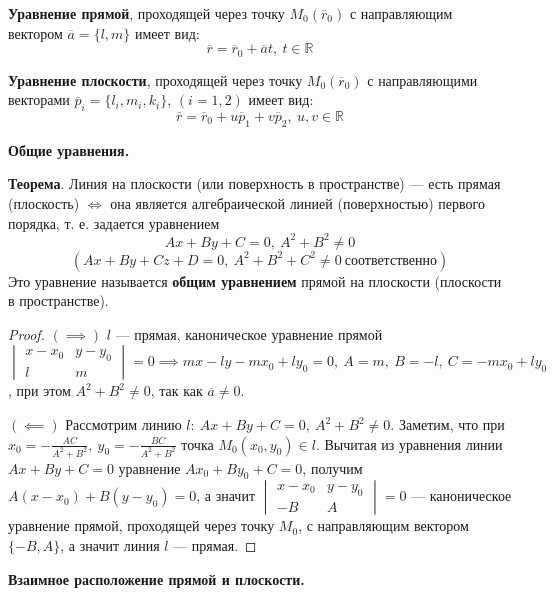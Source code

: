 \textbf{Уравнение прямой}, проходящей через точку $M_0(\overline{r}_0)$ с направляющим вектором $\overline{a}=\{l,m\}$ имеет вид:
$$\overline{r} = \overline{r}_0 + \overline{a}t,~t\in\mathbb{R}$$

\textbf{Уравнение плоскости}, проходящей через точку $M_0(\overline{r}_0)$ с направляющими векторами $\overline{p}_i=\{l_i,m_i,k_i\}$, $(i=1,2)$ имеет вид:
$$\overline{r} = \overline{r}_0 + u\overline{p}_1 + v\overline{p}_2,~u,v\in\mathbb{R}$$

\bigbreak
\centerline{\textbf{Общие уравнения.}}

\textbf{Теорема}. Линия на плоскости (или поверхность в пространстве) --- есть прямая (плоскость) $\iff$ она является алгебраической линией (поверхностью) первого порядка, т. е. задается уравнением $$Ax+By+C=0,~A^2+B^2\neq0$$ $$(Ax+By+Cz+D=0,~A^2+B^2+C^2\neq0~\text{соответственно})$$ 
Это уравнение называется \textbf{общим уравнением} прямой на плоскости (плоскости в пространстве).

\begin{proof} $(\implies)$
$l$ --- прямая, каноническое уравнение прямой $\begin{vmatrix} x-x_0 & y-y_0 \\ l & m \end{vmatrix} = 0 \implies mx -ly -mx_0 +ly_0 = 0,~A=m,~B=-l,~C=-mx_0 +ly_0$, при этом $A^2+B^2\neq0$, так как $\overline{a}\neq 0$.

$(\impliedby)$ Рассмотрим линию $l:~Ax+By+C=0,~A^2+B^2\neq0$. Заметим, что при $x_0=-\frac{AC}{A^2+B^2},~y_0=-\frac{BC}{A^2+B^2}$ точка $M_0(x_0,y_0)\in l$. Вычитая из уравнения линии $Ax+By+C=0$ уравнение $Ax_0+By_0+C=0$, получим $A(x-x_0)+B(y-y_0)=0$, а значит $\begin{vmatrix} x-x_0 & y-y_0 \\ -B & A \end{vmatrix} = 0$ --- каноническое уравнение прямой, проходящей через точку $M_0$, с направляющим вектором $\{-B,A\}$, а значит линия $l$ --- прямая. 
\end{proof}
    


\textbf{Взаимное расположение прямой и плоскости.} 

